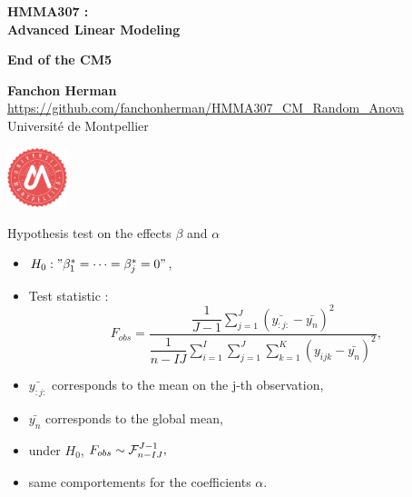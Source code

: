 \documentclass[unknownkeysallowed]{beamer}
\begin{document}



\begin{frame}
\bigskip
\bigskip
\begin{center}{
\LARGE\color{marron}
\textbf{HMMA307 : \\ Advanced Linear Modeling}
\textbf{ }\\
\vspace{0.5cm}
}

\color{marron}
\textbf{End of the CM5}
\end{center}

\vspace{0.5cm}

\begin{center}
\textbf{Fanchon Herman } \\
\vspace{0.1cm}
\url{https://github.com/fanchonherman/HMMA307_CM_Random_Anova}\\
\vspace{0.5cm}
Université de Montpellier \\
\end{center}

\centering
\includegraphics[width=0.13\textwidth]{Logo}

\end{frame}

\begin{frame}{Hypothesis test on the effects $\beta$ and $\alpha$}
\begin{itemize}
    \item $H_0:"\beta^*_1=\dots = \beta^*_j=0"$,
    \item Test statistic :
    $$F_{obs}=\dfrac{\dfrac{1}{J-1} \sum_{j=1}^J (\bar{y_{:j:}}-\bar{y_n})^2 }{{\dfrac{1}{n-IJ} \sum_{i=1}^I \sum_{j=1}^{J} \sum_{k=1}^{K} ( y_{ijk}-\bar{y_n})^2}},$$
    \item $\bar{y_{:j:}}$ corresponds to the mean on the j-th observation,
    \item $\bar{y_n}$ corresponds to the global mean,
    \item under $H_0$, $F_{obs} \sim \mathcal{F}^{J-1}_{n-IJ},$
    \item same comportements for the coefficients $\alpha$.
\end{itemize}
\end{frame}
\end{document}
